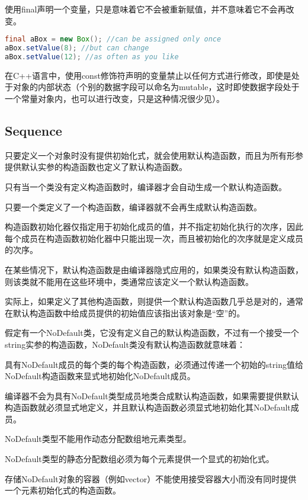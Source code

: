 使用final声明一个变量，只是意味着它不会被重新赋值，并不意味着它不会再改变。



\begin{lstlisting}[language=Java]
final aBox = new Box(); //can be assigned only once
aBox.setValue(8); //but can change
aBox.setValue(12); //as often as you like
\end{lstlisting}

在C++语言中，使用const修饰符声明的变量禁止以任何方式进行修改，即使是处于对象的内部状态（个别的数据字段可以命名为mutable，这时即使数据字段处于一个常量对象内，也可以进行改变，只是这种情况很少见）。


\subsection{Sequence}

只要定义一个对象时没有提供初始化式，就会使用默认构造函数，而且为所有形参提供默认实参的构造函数也定义了默认构造函数。

\begin{compactitem}
\item 只有当一个类没有定义构造函数时，编译器才会自动生成一个默认构造函数。
\item 只要一个类定义了一个构造函数，编译器就不会再生成默认构造函数。
\end{compactitem}

构造函数初始化器仅指定用于初始化成员的值，并不指定初始化执行的次序，因此每个成员在构造函数初始化器中只能出现一次，而且被初始化的次序就是定义成员的次序。

在某些情况下，默认构造函数是由编译器隐式应用的，如果类没有默认构造函数，则该类就不能用在这些环境中，类通常应该定义一个默认构造函数。

实际上，如果定义了其他构造函数，则提供一个默认构造函数几乎总是对的，通常在默认构造函数中给成员提供的初始值应该指出该对象是“空”的。

假定有一个NoDefault类，它没有定义自己的默认构造函数，不过有一个接受一个string实参的构造函数，NoDefault类没有默认构造函数就意味着：

\begin{compactenum}
\item 具有NoDefault成员的每个类的每个构造函数，必须通过传递一个初始的string值给NoDefault构造函数来显式地初始化NoDefault成员。
\item 编译器不会为具有NoDefault类型成员地类合成默认构造函数，如果需要提供默认构造函数就必须显式地定义，并且默认构造函数必须显式地初始化其NoDefault成员。
\item NoDefault类型不能用作动态分配数组地元素类型。
\item NoDefault类型的静态分配数组必须为每个元素提供一个显式的初始化式。
\item 存储NoDefault对象的容器（例如vector）不能使用接受容器大小而没有同时提供一个元素初始化式的构造函数。
\end{compactenum}



